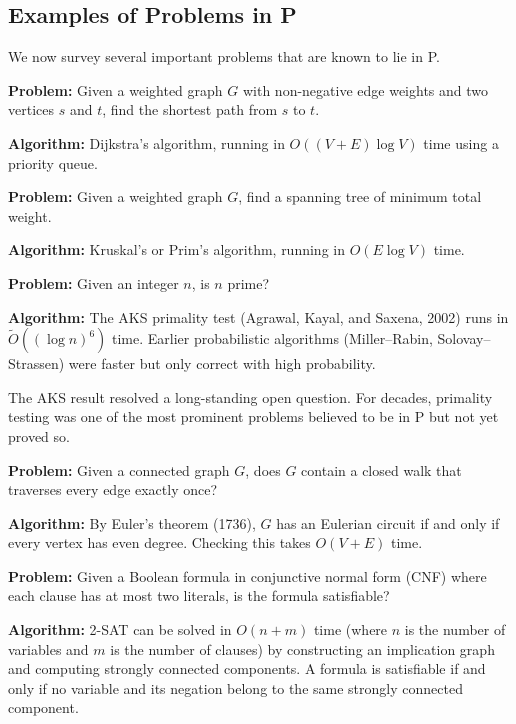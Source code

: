 \subsection{Examples of Problems in P}

We now survey several important problems that are known to lie in P.

\begin{example}
\textbf{Problem:} Given a weighted graph $G$ with non-negative edge weights and two vertices $s$ and $t$, find the shortest path from $s$ to $t$.
\par\textbf{Algorithm:} Dijkstra's algorithm, running in $O((V + E) \log V)$ time using a priority queue.
\end{example}

\begin{example}
\textbf{Problem:} Given a weighted graph $G$, find a spanning tree of minimum total weight.
\par\textbf{Algorithm:} Kruskal's or Prim's algorithm, running in $O(E \log V)$ time.
\end{example}

\begin{example}
\textbf{Problem:} Given an integer $n$, is $n$ prime?
\par\textbf{Algorithm:} The AKS primality test (Agrawal, Kayal, and Saxena, 2002) runs in $\tilde{O}((\log n)^6)$ time. Earlier probabilistic algorithms (Miller--Rabin, Solovay--Strassen) were faster but only correct with high probability.
\end{example}

The AKS result resolved a long-standing open question. For decades, primality testing was one of the most prominent problems believed to be in P but not yet proved so.

\begin{example}
\textbf{Problem:} Given a connected graph $G$, does $G$ contain a closed walk that traverses every edge exactly once?
\par\textbf{Algorithm:} By Euler's theorem (1736), $G$ has an Eulerian circuit if and only if every vertex has even degree. Checking this takes $O(V + E)$ time.
\end{example}

\begin{example}[2-SAT]
\textbf{Problem:} Given a Boolean formula in conjunctive normal form (CNF) where each clause has at most two literals, is the formula satisfiable?
\par\textbf{Algorithm:} 2-SAT can be solved in $O(n + m)$ time (where $n$ is the number of variables and $m$ is the number of clauses) by constructing an implication graph and computing strongly connected components. A formula is satisfiable if and only if no variable and its negation belong to the same strongly connected component.
\end{example}

